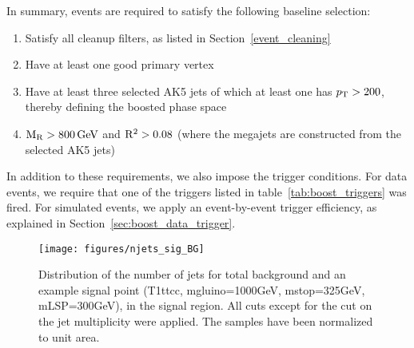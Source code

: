 In summary, events are required to satisfy the following baseline selection:
\begin{enumerate}
 \item Satisfy all cleanup filters, as listed in Section~\ref{event_cleaning}
 \item Have at least one good primary vertex
 \item Have at least three selected AK5 jets of which at least one has  $p_{\mathrm{T}} > 200$\GeV, thereby
 defining the boosted phase space
 \item $\mathrm{M_R} > 800\,\text{Ge\hspace{-.08em}V}$ and $\mathrm{R^2} > 0.08$ (where the megajets are constructed from the selected AK5
jets)
\end{enumerate}
In addition to these requirements, we also impose the trigger conditions. 
For data events, we require that one of the triggers listed in table~\ref{tab:boost_triggers} was
fired. 
For simulated events, we apply an event-by-event trigger efficiency, as explained in
Section~\ref{sec:boost_data_trigger}. 


\begin{figure}[htbp]
 \centering
 \texttt{[image: figures/njets\_sig\_BG]}
 \caption{Distribution of the number of jets for total background and an example signal point
(T1ttcc, mgluino=1000GeV, mstop=325GeV, mLSP=300GeV), in the signal region. All cuts except for the
cut on the jet multiplicity were applied. The samples have been normalized to unit area.
 \label{fig:njets_sig_BG}}
\end{figure}

